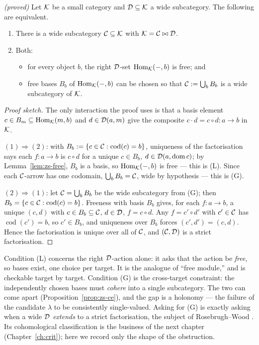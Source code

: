 \begin{theorem}\label{thm:zs-criterion}
\emph{(proved)}\;
Let $\mathcal{K}$ be a small category and $\mathcal{D}\subseteq\mathcal{K}$ a wide subcategory. The following
are equivalent.
\begin{enumerate}
\item There is a wide subcategory $\mathcal{C}\subseteq\mathcal{K}$ with $\mathcal{K}=\mathcal{C}\bowtie\mathcal{D}$.
\item Both:
\begin{itemize}
\item[\textnormal{(L)}] for every object $b$, the right $\mathcal{D}$-set $\mathrm{Hom}_{\mathcal{K}}(-,b)$ is
free; and
\item[\textnormal{(G)}] free bases $B_b$ of $\mathrm{Hom}_{\mathcal{K}}(-,b)$ can be chosen so that
$\mathcal{C}:=\bigcup_{b}B_b$ is a wide subcategory of $\mathcal{K}$.
\end{itemize}
\end{enumerate}
\end{theorem}

\begin{proof}[Proof sketch]
The only interaction the proof uses is that a basis element $c\in B_m\subseteq
\mathrm{Hom}_{\mathcal{K}}(m,b)$ and $d\in\mathcal{D}(a,m)$ give the composite $c\cdot d=c\circ d\colon a\to b$
in $\mathcal{K}$.

$(1)\Rightarrow(2)$: with $B_b:=\{c\in\mathcal{C}:\operatorname{cod}(c)=b\}$, uniqueness of
the factorisation says each $f\colon a\to b$ is $c\circ d$ for a unique $c\in B_b$,
$d\in\mathcal{D}(a,\operatorname{dom} c)$; by Lemma~\ref{lem:zs-free}, $B_b$ is a basis, so
$\mathrm{Hom}_{\mathcal{K}}(-,b)$ is free --- this is (L). Since each $\mathcal{C}$-arrow has one codomain,
$\bigcup_b B_b=\mathcal{C}$, wide by hypothesis --- this is (G).

$(2)\Rightarrow(1)$: let $\mathcal{C}=\bigcup_b B_b$ be the wide subcategory from (G); then
$B_b=\{c\in\mathcal{C}:\operatorname{cod}(c)=b\}$. Freeness with basis $B_b$ gives, for each
$f\colon a\to b$, a unique $(c,d)$ with $c\in B_b\subseteq\mathcal{C}$, $d\in\mathcal{D}$, $f=c\circ
d$. Any $f=c'\circ d'$ with $c'\in\mathcal{C}$ has $\operatorname{cod}(c')=b$, so $c'\in
B_b$, and uniqueness over $B_b$ forces $(c',d')=(c,d)$. Hence the factorisation is
unique over all of $\mathcal{C}$, and $(\mathcal{C},\mathcal{D})$ is a strict factorisation.
\end{proof}

\begin{remark}\label{rem:zs-twolevels}
Condition (L) concerns the right $\mathcal{D}$-action alone: it asks that the action be
\emph{free}, so bases exist, one choice per target. It is the analogue of ``free
module,'' and is checkable target by target. Condition (G) is the cross-target
constraint: the independently chosen bases must \emph{cohere} into a single
subcategory. The two can come apart (Proposition~\ref{prop:zs-ce}), and the gap is
a holonomy --- the failure of the candidate $\lambda$ to be consistently
single-valued. Asking for (G) is exactly asking when a wide $\mathcal{D}$ \emph{extends} to
a strict factorisation, the subject of Rosebrugh--Wood \cite{rw}. Its cohomological
classification is the business of the next chapter (Chapter~\ref{ch:crit}); here we
record only the shape of the obstruction.
\end{remark}

